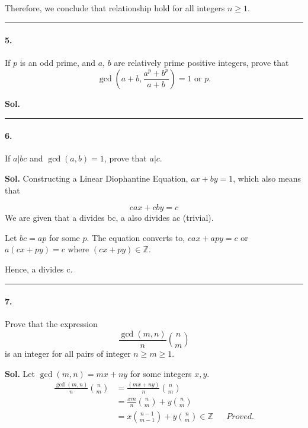 \documentclass[12pt]{amsart}
\begin{document}
Therefore, we conclude that relationship hold for all integers $n \ge 1.$

\par\noindent\textcolor{gray}{\rule{\textwidth}{0.5pt}}
\smallskip

\paragraph*{5.} If $p$ is an odd prime, and $a$, $b$ are relatively prime positive integers, prove that $$\gcd{\left(a+b,\frac{a^p+b^p}{a+b}\right)} = 1 \text{ or } p.$$

\bigskip
\textbf{Sol.}


\par\noindent\textcolor{gray}{\rule{\textwidth}{0.5pt}}
\smallskip

\paragraph*{6.} If $a|bc$ and $\gcd{(a, b)} = 1$, prove that $a|c$.

\bigskip
\textbf{Sol.}
Constructing a Linear Diophantine Equation, $ ax+by=1 $, which also means that 

$$ cax + cby = c $$
We are given that a divides bc, a also divides ac (trivial).

Let $bc = ap$ for some $p$. The equation converts to, $ cax + apy = c $ or $ a(cx + py) = c$ where $(cx + py) \in \mathbb{Z}$.

Hence, a divides c.


\par\noindent\textcolor{gray}{\rule{\textwidth}{0.5pt}}
\smallskip

\paragraph*{7.} Prove that the expression 
$$\frac{\gcd{(m, n)}}{n}\binom{n}{m}$$ 
is an integer for all pairs of integer $n \ge m \ge 1$.

\bigskip
\textbf{Sol.}
Let $\gcd{(m, n)} = mx+ny$ for some integers $x, y$.
\begin{align*}
    \frac{\gcd{(m, n)}}{n}\binom{n}{m} &= \frac{(mx+ny)}{n}\binom{n}{m} \\
    &= \frac{xm}{n}\binom{n}{m} + y\binom{n}{m} \\
    &= x\binom{n-1}{m-1} + y\binom{n}{m} \in \mathbb{Z} && Proved.
\end{align*}
\end{document}
